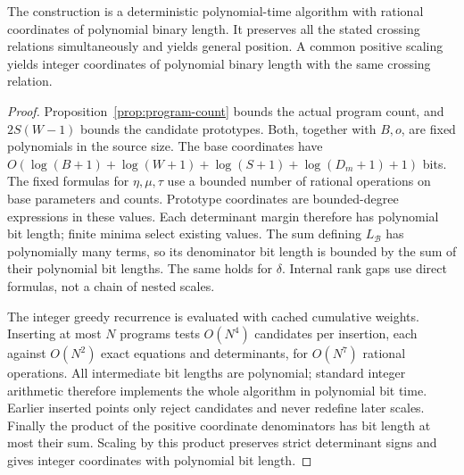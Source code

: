 \begin{proposition}\label{prop:realization}
The construction is a deterministic polynomial-time algorithm with rational coordinates of polynomial binary length. It preserves all the stated crossing relations simultaneously and yields general position. A common positive scaling yields integer coordinates of polynomial binary length with the same crossing relation.
\end{proposition}
\begin{proof}
Proposition~\ref{prop:program-count} bounds the actual program count, and $2S(W-1)$ bounds the candidate prototypes. Both, together with $B,o$, are fixed polynomials in the source size. The base coordinates have
$O(\log(B+1)+\log(W+1)+\log(S+1)+\log(D_m+1)+1)$ bits. The fixed formulas for $\eta,\mu,\tau$ use a bounded number of rational operations on base parameters and counts. Prototype coordinates are bounded-degree expressions in these values. Each determinant margin therefore has polynomial bit length; finite minima select existing values. The sum defining $L_{\mathcal B}$ has polynomially many terms, so its denominator bit length is bounded by the sum of their polynomial bit lengths. The same holds for $\delta$. Internal rank gaps use direct formulas, not a chain of nested scales.

The integer greedy recurrence is evaluated with cached cumulative weights. Inserting at most $N$ programs tests $O(N^4)$ candidates per insertion, each against $O(N^2)$ exact equations and determinants, for $O(N^7)$ rational operations. All intermediate bit lengths are polynomial; standard integer arithmetic therefore implements the whole algorithm in polynomial bit time. Earlier inserted points only reject candidates and never redefine later scales. Finally the product of the positive coordinate denominators has bit length at most their sum. Scaling by this product preserves strict determinant signs and gives integer coordinates with polynomial bit length.
\end{proof}
